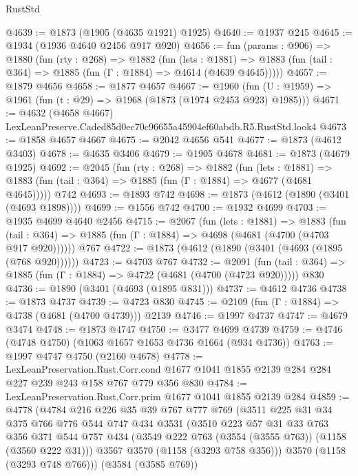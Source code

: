 \begin{lexlean}{RustStd}
\begin{coremodule}
@4639 := @1873 (@1905 (@4635 @1921) @1925)
@4640 := @1937 @245
@4645 := @1934 (@1936 @4640 @2456 @917 @920)
@4656 := fun (params : @906) =>
  @1880
    (fun (rty : @268) =>
    @1882
      (fun (lets : @1881) =>
      @1883 (fun (tail : @364) => @1885 (fun (Γ : @1884) => @4614 (@4639 @4645)))))
@4657 := @1879 @4656
@4658 := @1877 @4657
@4667 := @1960 (fun (U : @1959) => @1961 (fun (t : @29) => @1968 (@1873 (@1974 @2453 @923) @1985)))
@4671 := @4632 (@4658 @4667) LexLeanPreserve.Caded85d0ec70c96655a45904ef60abdb.R5.RustStd.look4
@4673 := @1858 @4657 @4667
@4675 := @2042 @4656 @541
@4677 := @1873 (@4612 @3403)
@4678 := @4635 @3406
@4679 := @1905 @4678
@4681 := @1873 (@4679 @1925)
@4692 := @2045
    (fun (rty : @268) =>
    @1882
      (fun (lets : @1881) =>
      @1883 (fun (tail : @364) => @1885 (fun (Γ : @1884) => @4677 (@4681 @4645)))))
    @742
@4693 := @1893 @742
@4698 := @1873 (@4612 (@1890 (@3401 (@4693 @1898))))
@4699 := @1556 @742
@4700 := @1932 @4699
@4703 := @1935 @4699 @4640 @2456
@4715 := @2067
    (fun (lets : @1881) =>
    @1883 (fun (tail : @364) => @1885 (fun (Γ : @1884) => @4698 (@4681 (@4700 (@4703 @917 @920))))))
    @767
@4722 := @1873 (@4612 (@1890 (@3401 (@4693 (@1895 (@768 @920))))))
@4723 := @4703 @767
@4732 := @2091
    (fun (tail : @364) => @1885 (fun (Γ : @1884) => @4722 (@4681 (@4700 (@4723 @920)))))
    @830
@4736 := @1890 (@3401 (@4693 (@1895 @831)))
@4737 := @4612 @4736
@4738 := @1873 @4737
@4739 := @4723 @830
@4745 := @2109 (fun (Γ : @1884) => @4738 (@4681 (@4700 @4739))) @2139
@4746 := @1997 @4737
@4747 := @4679 @3474
@4748 := @1873 @4747
@4750 := @3477 @4699 @4739
@4759 := @4746 (@4748 @4750) (@1063 @1657 @1653 @4736 @1664 (@934 @4736))
@4763 := @1997 @4747 @4750 (@2160 @4678)
@4778 := LexLeanPreservation.Rust.Corr.cond
    @1677
    @1041
    @1855
    @2139
    @284
    @284
    @227
    @239
    @243
    @158
    @767
    @779
    @356
    @830
@4784 := LexLeanPreservation.Rust.Corr.prim @1677 @1041 @1855 @2139 @284
@4859 := @4778
    (@4784
      @216
      @226
      @35
      @39
      @767
      @777
      @769
      (@3511
        @225
        @31
        @34
        @375
        @766
        @776
        @544
        @747
        @434
        @3531
        (@3510
          @223
          @57
          @31
          @33
          @763
          @356
          @371
          @544
          @757
          @434
          (@3549 @222 @763 (@3554 (@3555 @763)) (@1158 (@3560 @222 @31)))
          @3567
          @3570
          (@1158 (@3293 @758 @356)))
        @3570
        (@1158 (@3293 @748 @766)))
      (@3584 (@3585 @769))

\end{coremodule}
\end{lexlean}

